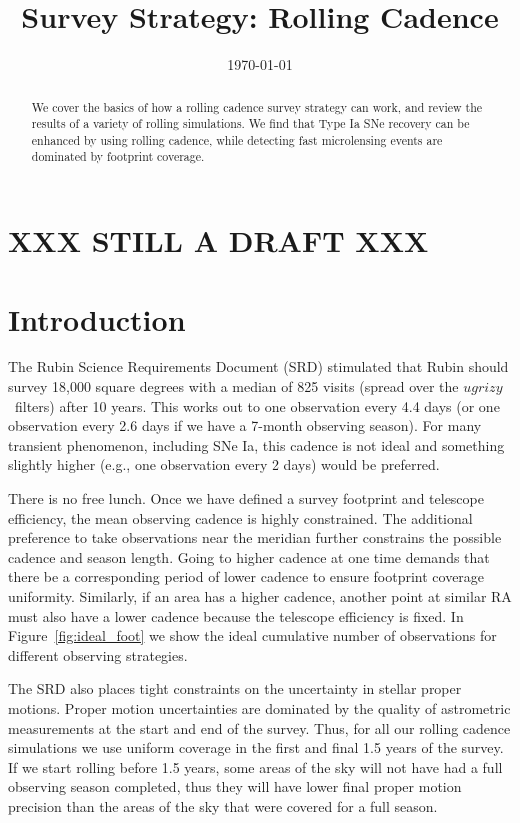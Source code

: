 \documentclass[modern]{aastex62}
\begin{document}

\date{\today}
\title{Survey Strategy: Rolling Cadence}

\begin{abstract}
We cover the basics of how a rolling cadence survey strategy can work, and review the results of a variety of rolling simulations. We find that Type Ia SNe recovery can be enhanced by using rolling cadence, while detecting fast microlensing events are dominated by footprint coverage.
\end{abstract}

\section{XXX STILL A DRAFT XXX}

\section{Introduction}

The Rubin Science Requirements Document (SRD) stimulated that Rubin should survey 18,000 square degrees with a median of 825 visits (spread over the $ugrizy$\ filters) after 10 years. This works out to one observation every 4.4 days (or one observation every 2.6 days if we have a 7-month observing season). For many transient phenomenon, including SNe Ia, this cadence is not ideal and something slightly higher (e.g., one observation every 2 days) would be preferred. 

There is no free lunch. Once we have defined a survey footprint and telescope efficiency, the mean observing cadence is highly constrained. The additional preference to take observations near the meridian further constrains the possible cadence and season length. Going to higher cadence at one time demands that there be a corresponding period of lower cadence to ensure footprint coverage uniformity. Similarly, if an area has a higher cadence, another point at similar RA must also have a lower cadence because the telescope efficiency is fixed.  In Figure~\ref{fig:ideal_foot} we show the ideal cumulative number of observations for different observing strategies. 

The SRD also places tight constraints on the uncertainty in stellar proper motions. Proper motion uncertainties are dominated by the quality of astrometric measurements at the start and end of the survey. Thus, for all our rolling cadence simulations we use uniform coverage in the first and final 1.5 years of the survey. If we start rolling before 1.5 years, some areas of the sky will not have had a full observing season completed, thus they will have lower final proper motion precision than the areas of the sky that were covered for a full season.
\end{document}
